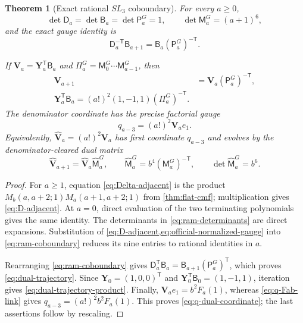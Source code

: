 \documentclass[11pt]{article}
\theoremstyle{keio}
\newtheorem{theorem}{Theorem}[section]
\theoremstyle{definition}
\theoremstyle{remark}
\begin{document}
\begin{theorem}[Exact rational \(SL_3\) coboundary]
\label{thm:ram-gauge}
For every \(a\ge0\),
\begin{equation}\label{eq:ram-determinants}
 \det\mathsf D_a=\det\mathsf B_a=\det\mathsf P_a^G=1,
 \qquad \det\mathsf M_a^G=(a+1)^6,
\end{equation}
and the exact gauge identity is
\begin{equation}\label{eq:ram-coboundary}
 \boxed{\displaystyle
 \mathsf D_a^{-\mathsf T}\mathsf B_{a+1}
 =\mathsf B_a(\mathsf P_a^G)^{-\mathsf T}.}
\end{equation}

If \(\mathbf V_a=\mathbf Y_a^{\mathsf T}\mathsf B_a\) and
\(\Pi_a^G=\mathsf M_0^G\cdots\mathsf M_{a-1}^G\), then
\begin{align}
 \mathbf V_{a+1}&=\mathbf V_a(\mathsf P_a^G)^{-\mathsf T},
 \label{eq:dual-trajectory}\\
 \boxed{\displaystyle
 \mathbf Y_a^{\mathsf T}\mathsf B_a
 =(a!)^2(1,-1,1)(\Pi_a^G)^{-\mathsf T}.}
 \label{eq:dual-trajectory-product}
\end{align}
The denominator coordinate has the precise factorial gauge
\begin{equation}\label{eq:q-dual-coordinate}
 \boxed{\displaystyle
 q_{a-3}=(a!)^2\mathbf V_ae_1.}
\end{equation}
Equivalently, \(\widehat{\mathbf V}_a=(a!)^2\mathbf V_a\) has first
coordinate \(q_{a-3}\) and evolves by the denominator-cleared dual matrix
\begin{equation}\label{eq:denominator-cleared-dual}
 \widehat{\mathbf V}_{a+1}
 =\widehat{\mathbf V}_a\widehat{\mathsf M}_a^G,\qquad
 \widehat{\mathsf M}_a^G=b^4(\mathsf M_a^G)^{-\mathsf T},\qquad
 \det\widehat{\mathsf M}_a^G=b^6.
\end{equation}
\end{theorem}

\begin{proof}
For \(a\ge1\), equation \eqref{eq:Delta-adjacent} is the product
\(M_b(a,a+2;1)M_a(a+1,a+2;1)\) from
\cref{thm:flat-cmf}; multiplication gives \eqref{eq:D-adjacent}.  At
\(a=0\), direct evaluation of the two terminating polynomials gives the
same identity.
The determinants in \eqref{eq:ram-determinants} are direct expansions.
Substitution of \cref{eq:D-adjacent,eq:official-normalized-gauge} into
\eqref{eq:ram-coboundary} reduces its nine entries to rational identities in
\(a\).

Rearranging \eqref{eq:ram-coboundary} gives
\(\mathsf D_a^{\mathsf T}\mathsf B_a
=\mathsf B_{a+1}(\mathsf P_a^G)^{\mathsf T}\), which proves
\eqref{eq:dual-trajectory}.  Since
\(\mathbf Y_0=(1,0,0)^{\mathsf T}\) and
\(\mathbf Y_0^{\mathsf T}\mathsf B_0=(1,-1,1)\), iteration gives
\eqref{eq:dual-trajectory-product}.  Finally,
\(\mathbf V_ae_1=b^2F_a(1)\), whereas
\eqref{eq:q-Fab-link} gives
\(q_{a-3}=(a!)^2b^2F_a(1)\).  This proves
\eqref{eq:q-dual-coordinate}; the last assertions follow by rescaling.
\end{proof}
\end{document}
